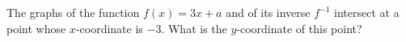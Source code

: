 The graphs of the function $f(x)=3x+a$ and of its inverse $f^{-1}$ intersect at a point whose $x$-coordinate is $-3$. What is the $y$-coordinate of this point?
